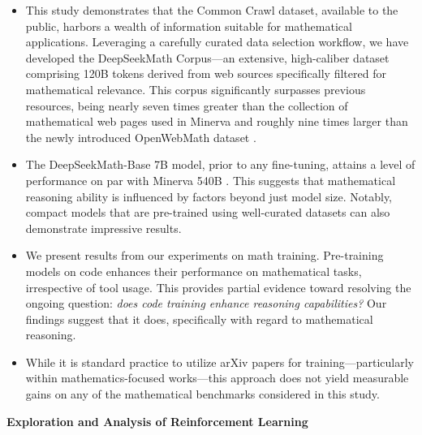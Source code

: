 \begin{itemize}[topsep=0pt]
    \item This study demonstrates that the Common Crawl dataset, available to the public, harbors a wealth of information suitable for mathematical applications. Leveraging a carefully curated data selection workflow, we have developed the DeepSeekMath Corpus—an extensive, high-caliber dataset comprising 120B tokens derived from web sources specifically filtered for mathematical relevance. This corpus significantly surpasses previous resources, being nearly seven times greater than the collection of mathematical web pages used in Minerva \citep{minerva} and roughly nine times larger than the newly introduced OpenWebMath dataset \citep{openwebmath}.

\item The DeepSeekMath-Base 7B model, prior to any fine-tuning, attains a level of performance on par with Minerva 540B \citep{minerva}. This suggests that mathematical reasoning ability is influenced by factors beyond just model size. Notably, compact models that are pre-trained using well-curated datasets can also demonstrate impressive results.

\item We present results from our experiments on math training. Pre-training models on code enhances their performance on mathematical tasks, irrespective of tool usage. This provides partial evidence toward resolving the ongoing question: \textit{does code training enhance reasoning capabilities?} Our findings suggest that it does, specifically with regard to mathematical reasoning.

\item While it is standard practice to utilize arXiv papers for training—particularly within mathematics-focused works—this approach does not yield measurable gains on any of the mathematical benchmarks considered in this study.
\end{itemize}

\textbf{Exploration and Analysis of Reinforcement Learning}

